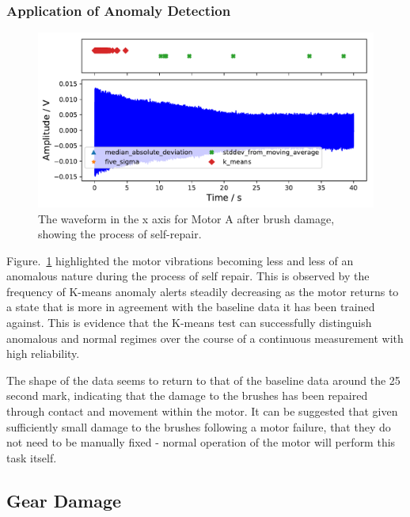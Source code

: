 \subsubsection{Application of Anomaly Detection}

\begin{figure}[t]
    \includegraphics[width=1.0\textwidth]{fig/large_manual_repair_large_12V.pdf}
    \caption[Anomaly Test Brush Damage]{The waveform in the x axis for Motor A after brush damage, showing the process of self-repair.}
    \label{fig:largemotor_brushdamage}
\end{figure}

Figure.~\ref{fig:largemotor_brushdamage} highlighted the motor vibrations becoming less and less of an anomalous nature during the process of self repair. This is observed by the frequency of K-means anomaly alerts steadily decreasing as the motor returns to a state that is more in agreement with the baseline data it has been trained against. This is evidence that the K-means test can successfully distinguish anomalous and normal regimes over the course of a continuous measurement with high reliability. 

The shape of the data seems to return to that of the baseline data around the 25 second mark, indicating that the damage to the brushes has been repaired through contact and movement within the motor. It can be suggested that given sufficiently small damage to the brushes following a motor failure, that they do not need to be manually fixed - normal operation of the motor will perform this task itself.


\subsection{Gear Damage}

